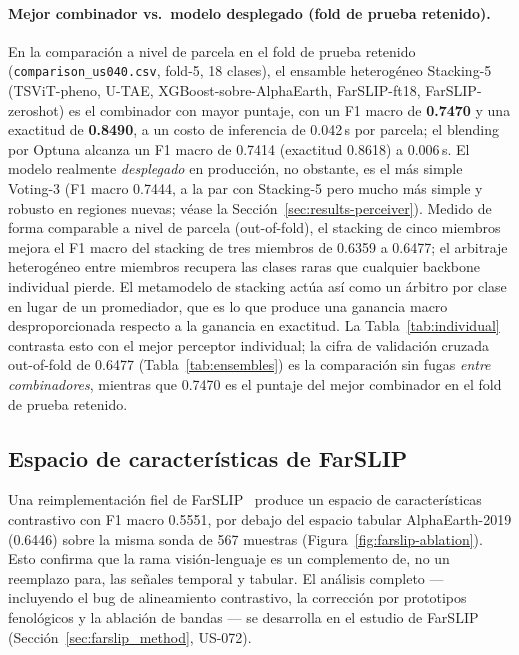 \paragraph{Mejor combinador vs.\ modelo desplegado (fold de prueba retenido).}
En la comparación a nivel de parcela en el fold de prueba retenido
(\texttt{comparison\_us040.csv}, fold-5, 18 clases), el ensamble
heterogéneo Stacking-5 (TSViT-pheno, U-TAE,
XGBoost-sobre-AlphaEarth, FarSLIP-ft18, FarSLIP-zeroshot) es el
combinador con mayor puntaje, con un F1 macro de \textbf{0.7470} y una
exactitud de \textbf{0.8490}, a un costo de inferencia de 0.042\,s por
parcela; el blending por Optuna alcanza un F1 macro de 0.7414 (exactitud
0.8618) a 0.006\,s. El modelo realmente \emph{desplegado} en producción,
no obstante, es el más simple Voting-3 (F1 macro 0.7444, a la par con
Stacking-5 pero mucho más simple y robusto en regiones nuevas; véase la
Sección~\ref{sec:results-perceiver}). Medido de forma comparable a nivel de parcela (out-of-fold), el
stacking de cinco miembros mejora el F1 macro del stacking de tres
miembros de 0.6359 a 0.6477; el arbitraje heterogéneo entre miembros
recupera las clases raras que cualquier backbone individual pierde. El
metamodelo de stacking actúa así como un árbitro por clase en lugar de
un promediador, que es lo que produce una ganancia macro
desproporcionada respecto a la ganancia en exactitud. La
Tabla~\ref{tab:individual} contrasta esto con el mejor perceptor
individual; la cifra de validación cruzada out-of-fold de 0.6477
(Tabla~\ref{tab:ensembles}) es la comparación sin fugas \emph{entre
combinadores}, mientras que 0.7470 es el puntaje del mejor combinador
en el fold de prueba retenido.

\subsection{Espacio de características de FarSLIP}
\label{sec:results-farslip}
Una reimplementación fiel de FarSLIP~\cite{li2025farslip} produce un
espacio de características contrastivo con F1 macro 0.5551, por debajo del
espacio tabular AlphaEarth-2019 (0.6446) sobre la misma sonda de 567
muestras (Figura~\ref{fig:farslip-ablation}). Esto confirma que la rama
visión-lenguaje es un complemento de, no un reemplazo para, las señales
temporal y tabular. El análisis completo --- incluyendo el bug de
alineamiento contrastivo, la corrección por prototipos fenológicos y la
ablación de bandas --- se desarrolla en el estudio de FarSLIP
(Sección~\ref{sec:farslip_method}, US-072).

